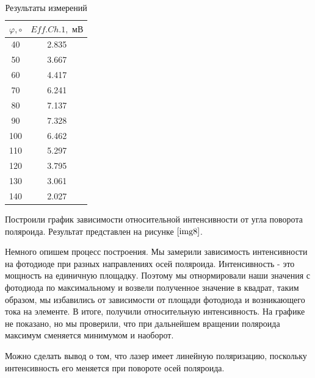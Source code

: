 \documentclass[a4paper,12pt]{article} %
\begin{document}
\begin{enumerate}
    \begin{table}[h]
        \centering
        \begin{tabular}{|c|c|}
        \hline
    	$\varphi, \circ$ & $Eff.Ch.1, \text{ мВ}$ \\ \hline
            40 & 2.835 \\ \hline
            50 & 3.667 \\ \hline
            60 & 4.417 \\ \hline
            70 & 6.241 \\ \hline
            80 & 7.137 \\ \hline
            90 & 7.328 \\ \hline
            100 & 6.462 \\ \hline
            110 & 5.297 \\ \hline
            120 & 3.795 \\ \hline
            130 & 3.061 \\ \hline
            140 & 2.027 \\ \hline
        \end{tabular}
    \caption{Результаты измерений}
    \label{tab2}
    \end{table}

    Построили график зависимости относительной интенсивности от угла поворота поляроида. Результат представлен на рисунке $\ref{img8}$.

    Немного опишем процесс построения. Мы замерили зависимость интенсивности на фотодиоде при разных направлениях осей поляроида. Интенсивность - это мощность на единичную площадку. Поэтому мы отнормировали наши значения с фотодиода по максимальному и возвели полученное значение в квадрат, таким образом, мы избавились от зависимости от площади фотодиода и возникающего тока на элементе. В итоге, получили относительную интенсивность. На графике не показано, но мы проверили, что при дальнейшем вращении поляроида максимум сменяется минимумом и наоборот. 

    Можно сделать вывод о том, что лазер имеет линейную поляризацию, поскольку интенсивность его меняется при повороте осей поляроида.


\end{enumerate}
\end{document}
